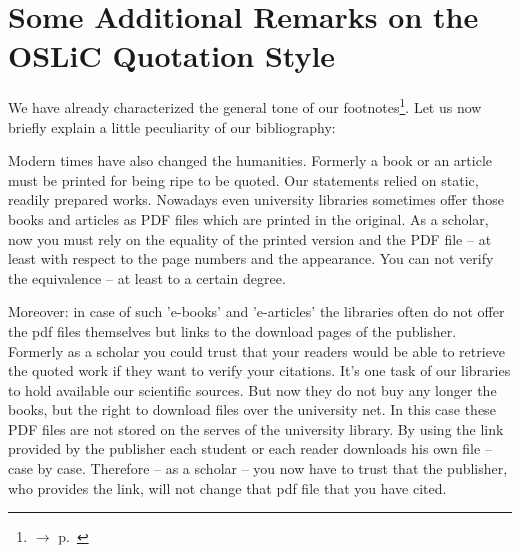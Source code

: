 %
%
%
%
%

\section{Some Additional Remarks on the OSLiC Quotation Style}\label{sec:QuotationAppendix}

We have already characterized the general tone of our
footnotes\footnote{$\rightarrow$ p.\ \pageref{QuotationPrinciple} }. Let us now
briefly explain a little peculiarity of our bibliography:

Modern times have also changed the humanities. Formerly a book or an article
must be printed for being ripe to be quoted. Our statements relied on static,
readily prepared works. Nowadays even university libraries sometimes offer those
books and articles as PDF files which are printed in the original. As a scholar,
now you must rely on the equality of the printed version and the PDF file -- at
least with respect to the page numbers and the appearance. You can not verify the
equivalence -- at least to a certain degree.

Moreover: in case of such 'e-books' and 'e-articles' the libraries often do not
offer the pdf files themselves but links to the download pages of the publisher.
Formerly as a scholar you could trust that your readers would be able to
retrieve the quoted work if they want to verify your citations. It's one task of
our libraries to hold available our scientific sources. But now they do not buy
any longer the books, but the right to download files over the university net.
In this case these PDF files are not stored on the serves of the university
library. By using the link provided by the publisher each student or each reader
downloads his own file -- case by case. Therefore -- as a scholar -- you now have
to trust that the publisher, who provides the link, will not change that pdf
file that you have cited.

